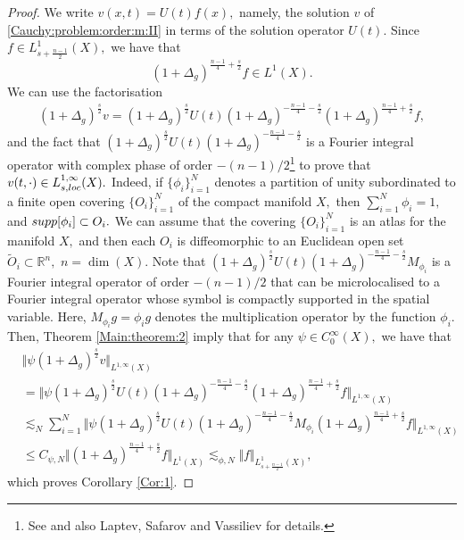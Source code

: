 \documentclass[12pt, reqno]{amsart}
\theoremstyle{definition}
\theoremstyle{remark}
\numberwithin{equation}{section}
\begin{document}
\begin{proof}
    We write $v(x,t)=U(t)f(x),$ namely, the solution $v$ of \eqref{Cauchy:problem:order:m:II} in terms of the solution operator $U(t).$ Since $f\in L^1_{s+\frac{n-1}{2}}(X), $ we have that 
    $$ (1+\Delta_g)^{\frac{n-1}{4}+\frac{s}{2}}f\in L^{1}(X).    $$ We can use the factorisation
    \begin{align*}
        (1+\Delta_g)^{\frac{s}{2}}v= (1+\Delta_g)^{\frac{s}{2}} U(t)(1+\Delta_g)^{-\frac{n-1}{4}-\frac{s}{2} } (1+\Delta_g)^{\frac{n-1}{4}+\frac{s}{2}}f,
    \end{align*} and the fact that $(1+\Delta_g)^{\frac{s}{2}}U(t)(1+\Delta_g)^{-\frac{n-1}{4}-\frac{s}{2} }$ is a Fourier integral operator with complex phase of order $-(n-1)/2$\footnote{See \cite[Page 117]{Ruzhansky:CWI-book} and also Laptev, Safarov and Vassiliev \cite{Laptev:Safarov:Vassiliev} for details.} to prove  that $v(t,\cdot)\in L^{1,\infty}_{s,\textnormal{loc}}(X).$ Indeed, if $\{\phi_i\}_{i=1}^{N}$ denotes a partition of unity subordinated to a finite open covering $\{O_{i}\}_{i=1}^{N}$  of the compact manifold $X,$ then  $\sum_{i=1}^{N}\phi_i=1,$ and $\textnormal{supp}[\phi_i]\subset O_i.$ We can assume that the covering $\{O_{i}\}_{i=1}^{N}$ is an atlas for the manifold $X,$ and then each $O_{i}$ is diffeomorphic to an Euclidean open set $\tilde{O}_i\subset\mathbb{R}^n,$ $n=\dim(X).$   Note that $(1+\Delta_g)^{\frac{s}{2}} U(t)(1+\Delta_g)^{-\frac{n-1}{4}-\frac{s}{2} }M_{\phi_{i}}$ is a Fourier integral operator of order $-(n-1)/2$ that can be microlocalised to a Fourier integral operator whose symbol is compactly supported in the spatial variable. Here, $M_{\phi_{i}}g=\phi_{i}g$ denotes the multiplication operator by the function $\phi_{i}.$  Then, Theorem \ref{Main:theorem:2} imply that for any $\psi\in C^{\infty}_0(X),$ we have that
    \begin{align*}
       & \Vert \psi (1+\Delta_g)^{\frac{s}{2}}v \Vert_{L^{1,\infty}(X)}\\
       &=  \Vert\psi (1+\Delta_g)^{\frac{s}{2}} U(t)(1+\Delta_g)^{-\frac{n-1}{4}-\frac{s}{2} } (1+\Delta_g)^{\frac{n-1}{4}+\frac{s}{2}}f \Vert_{L^{1,\infty}(X)}\\
        &\lesssim_N\sum_{i=1}^{N} \Vert\psi (1+\Delta_g)^{\frac{s}{2}} U(t)(1+\Delta_g)^{-\frac{n-1}{4}-\frac{s}{2} }M_{\phi_i} (1+\Delta_g)^{\frac{n-1}{4}+\frac{s}{2}}f \Vert_{L^{1,\infty}(X)}\\
        &\leq C_{\psi,N}\Vert (1+\Delta_g)^{\frac{n-1}{4}+\frac{s}{2}}f\Vert_{L^{1}(X)}\lesssim_{\phi,N}\Vert f\Vert_{L^{1}_{s+\frac{n-1}{2}}(X)},
    \end{align*}which proves Corollary \ref{Cor:1}.
\end{proof}
\end{document}
